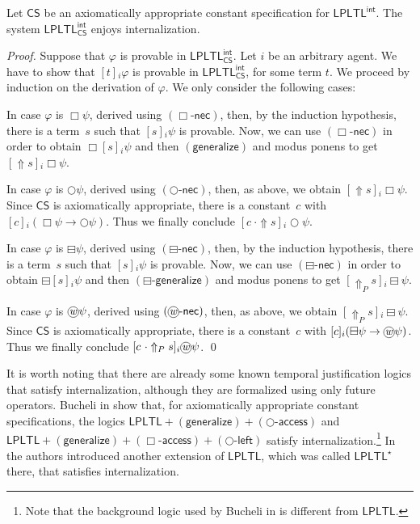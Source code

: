 \documentclass[envcountsect,envcountsame,oribibl,orivec]{llncs}
\newcommand*\circled[1]{\tikz[baseline=(char.base)]{
		\node[shape=circle,draw,inner sep=0.4pt] (char) {#1};}}
\newcommand{\lnext}{\bigcirc}
\newcommand{\lalways}{\Box}
\newcommand{\lsofar}{\boxminus}
\newcommand{\wprevious}{\circled{\textit{w}}}
\newcommand{\necrule}{\ensuremath{\textsf{-nec}}}
\newcommand{\nextnecrule}{\ensuremath{(\lnext\necrule)}}
\newcommand{\alwaysnecrule}{\ensuremath{(\lalways\necrule)}}
\newcommand{\prevnecrule}{\ensuremath{(\wprevious\necrule)}}
\newcommand{\sofarnecrule}{\ensuremath{(\lsofar\necrule)}}
\newcommand{\LPLTL}{\textsf{LPLTL}}
\newcommand{\jbox}[1]{\left[#1\right]\!}
\newcommand{\tapp}{\cdot}
\newcommand{\tgeneralize}{\Uparrow}
\newcommand{\CS}{\textsf{CS}}
\newcommand{\agent}{i}
\newcommand{\alwaysaccessprinciple}{\ensuremath{(\lalways\textsf{-access})}}
\newcommand{\generalizeprinciple}{\ensuremath{(\textsf{generalize})}}
\newcommand{\nextaccessprinciple}{\ensuremath{(\lnext\textsf{-access})}}
\newcommand{\nextleftshiftprinciple}{\ensuremath{(\lnext\textsf{-left})}}
\newcommand{\pastgeneralizeprinciple}{\ensuremath{(\lsofar\textsf{-generalize})}}
\renewcommand{\phi}{\varphi}
\begin{document}
\begin{theorem}[Internalization]\label{thm:internalization LPLTL^int}
	Let\/ $\CS$ be an axiomatically appropriate constant specification for $\LPLTL^\mathsf{int}$. 
	The system $\LPLTL^\mathsf{int}_\CS$ enjoys internalization.
\end{theorem}
\begin{proof}
	Suppose that $\phi$ is provable in $\LPLTL^\mathsf{int}_\CS$. Let $i$ be an arbitrary agent. We have to show that $\jbox{t}_i \phi$ is provable in $\LPLTL^\mathsf{int}_\CS$, for some term $t$. We proceed by induction on the derivation of $\phi$. We only consider the following cases:
		
	In case $\phi$ is $\lalways \psi$, derived using $\alwaysnecrule$, then, by the induction hypothesis, there is a term~$s$ such that $\jbox{s}_\agent \psi$ is provable.
	Now, we can use $\alwaysnecrule$ in order to obtain $\lalways \jbox{s}_\agent \psi$ and then $\generalizeprinciple$ and modus ponens to get $
	\jbox{\tgeneralize s}_\agent \lalways \psi
	$.
	
	In case $\phi$ is $\lnext \psi$, derived using $\nextnecrule$, then, as above, we obtain $\jbox{\tgeneralize s}_\agent \lalways \psi$.
	Since $\CS$ is axiomatically appropriate, there is a constant~$c$ with $\jbox{c}_\agent (\lalways \psi \to \lnext \psi)$.
	Thus we finally conclude
	$
	\jbox{c\ \tapp \tgeneralize s}_\agent \lnext \psi
	$. 


In case $\phi$ is $\lsofar \psi$, derived using $\sofarnecrule$, then, by the induction hypothesis, there is a term~$s$ such that $\jbox{s}_\agent \psi$ is provable.
Now, we can use $\sofarnecrule$ in order to obtain $\lsofar \jbox{s}_\agent \psi$ and then $\pastgeneralizeprinciple$ and modus ponens to get $
\jbox{\tgeneralize_P s}_\agent \lsofar \psi
$.

In case $\phi$ is $\wprevious \psi$, derived using $\prevnecrule$, then, as above, we obtain $\jbox{\tgeneralize_P s}_\agent \lsofar \psi$.
Since $\CS$ is axiomatically appropriate, there is a constant~$c$ with $\jbox{c}_\agent (\lsofar \psi \to \wprevious \psi)$.
Thus we finally conclude
$
\jbox{c\ \tapp \tgeneralize_P s}_\agent \wprevious \psi
$. \qed
\end{proof}

\begin{remark}
	It is worth noting that there are already some known temporal justification logics that satisfy internalization, although they are formalized using only future operators.  Bucheli in \cite{Bucheli15} show that, for axiomatically appropriate constant specifications, the logics $\LPLTL + \generalizeprinciple + \nextaccessprinciple$ and $\LPLTL + \generalizeprinciple + \alwaysaccessprinciple + \nextleftshiftprinciple$ satisfy internalization.\footnote{Note that the background logic used by Bucheli in \cite{Bucheli15} is different from $\LPLTL$.} In \cite{BucheliGhariStuder2017} the authors introduced another extension of $\LPLTL$, which was called $\LPLTL^\star$ there, that satisfies internalization.
\end{remark}
\end{document}
